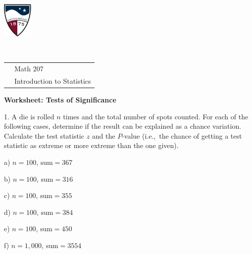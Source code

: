 \documentclass[10pt]{article}
\begin{document}
\pagestyle{empty}
\lstset{language=R, showspaces=false, showstringspaces=false}
\href{http://www.su.edu}{\includegraphics[height=1.75cm]{sulogo.eps}}
\vspace{-1.79cm}

{{\ }\hfill\small
\begin{tabular}{cl}
& Math 207\\
& Introduction to Statistics\\
\end{tabular}
}

\setlength{\baselineskip}{1.05\baselineskip}
\medskip

\begin{center}
\textbf{\large  Worksheet:  Tests of Significance}
\end{center}
\smallskip

\newcommand{\HH}{\hspace{20pt}\hphantom{a) } }

1. A die is rolled $n$ times and the total number of spots counted.
For each of the following cases, determine if the result can be explained as a chance
variation.  Calculate the test statistic $z$ and the $P$-value
(i.e.,~the chance of getting a test statistic 
  as extreme or more extreme than the one given).

\hspace{20pt} a) $n=100$, $\mbox{sum}=367$
\vspace{1in}

\hspace{20pt} b) $n=100$, $\mbox{sum}=316$
\vspace{1in}

\hspace{20pt} c) $n=100$, $\mbox{sum}=355$
\vspace{1in}

\hspace{20pt} d) $n=100$, $\mbox{sum}=384$
\vspace{1in}

\hspace{20pt} e) $n=100$, $\mbox{sum}=450$
\vspace{1in}

\hspace{20pt} f) $n=1,000$, $\mbox{sum}=3554$
\vspace{1in}
\end{document}

